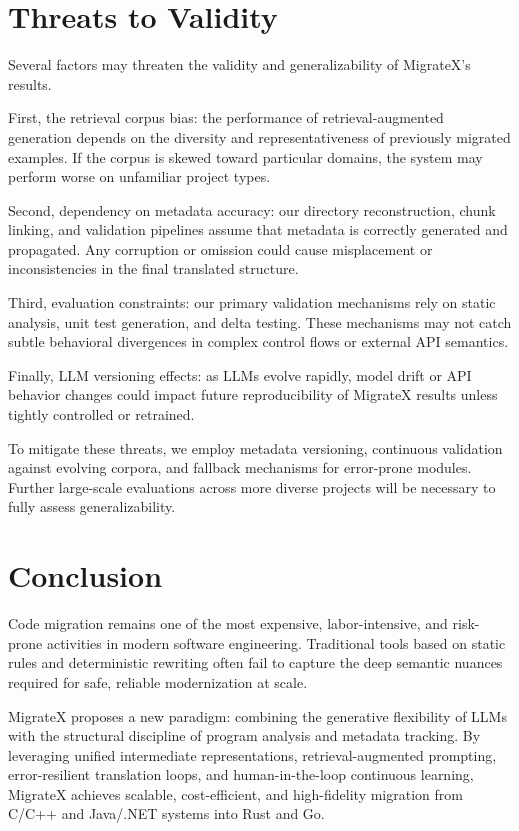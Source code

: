 \documentclass[twocolumn]{article}
\begin{document}
\section{Threats to Validity}

Several factors may threaten the validity and generalizability of MigrateX's results.

First, the retrieval corpus bias: the performance of retrieval-augmented generation depends on the diversity and representativeness of previously migrated examples. If the corpus is skewed toward particular domains, the system may perform worse on unfamiliar project types.

Second, dependency on metadata accuracy: our directory reconstruction, chunk linking, and validation pipelines assume that metadata is correctly generated and propagated. Any corruption or omission could cause misplacement or inconsistencies in the final translated structure.

Third, evaluation constraints: our primary validation mechanisms rely on static analysis, unit test generation, and delta testing. These mechanisms may not catch subtle behavioral divergences in complex control flows or external API semantics.

Finally, LLM versioning effects: as LLMs evolve rapidly, model drift or API behavior changes could impact future reproducibility of MigrateX results unless tightly controlled or retrained.

To mitigate these threats, we employ metadata versioning, continuous validation against evolving corpora, and fallback mechanisms for error-prone modules. Further large-scale evaluations across more diverse projects will be necessary to fully assess generalizability.


\section{Conclusion}

Code migration remains one of the most expensive, labor-intensive, and risk-prone activities in modern software engineering. Traditional tools based on static rules and deterministic rewriting often fail to capture the deep semantic nuances required for safe, reliable modernization at scale.

MigrateX proposes a new paradigm: combining the generative flexibility of LLMs with the structural discipline of program analysis and metadata tracking. By leveraging unified intermediate representations, retrieval-augmented prompting, error-resilient translation loops, and human-in-the-loop continuous learning, MigrateX achieves scalable, cost-efficient, and high-fidelity migration from C/C++ and Java/.NET systems into Rust and Go.
\end{document}
